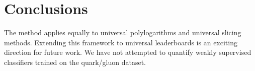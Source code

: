 \section{Conclusions}\label{sec:conclusions}

The method applies equally to universal polylogarithms and universal
slicing methods. Extending this framework to universal leaderboards is
an exciting direction for future work. We have not attempted to quantify
weakly supervised classifiers trained on the quark/gluon dataset.

